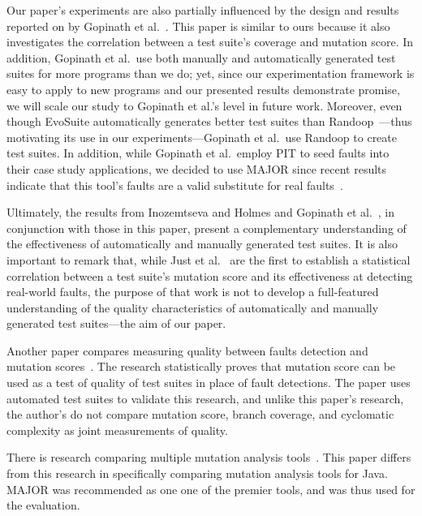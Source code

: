 Our paper's experiments are also partially influenced by the design and results reported on by Gopinath et
al.~\cite{gopinath2014}.  This paper is similar to ours because it also investigates the correlation between a test
suite's coverage and mutation score.  In addition, Gopinath et al.\ use both manually and automatically generated test
suites for more programs than we do; yet, since our experimentation framework is easy to apply to new programs and our
presented results demonstrate promise, we will scale our study to Gopinath et al.'s level in future work. Moreover, even
though EvoSuite automatically generates better test suites than Randoop~\cite{fraser2013a}---thus motivating its use in
our experiments---Gopinath et al.\ use Randoop to create test suites.  In addition, while Gopinath et al.\ employ PIT to
seed faults into their case study applications, we decided to use MAJOR since recent results indicate that this tool's
faults are a valid substitute for real faults~\cite{just2014}. 

Ultimately, the results from Inozemtseva and Holmes \cite{inozemtseva2014} and Gopinath et al.~\cite{gopinath2014}, in
conjunction with those in this paper, present a complementary understanding of the effectiveness of automatically and
manually generated test suites. It is also important to remark that, while Just et al.~\cite{just2014} are the first to
establish a statistical correlation between a test suite's mutation score and its effectiveness at detecting real-world
faults, the purpose of that work is not to develop a full-featured understanding of the quality characteristics of
automatically and manually generated test suites---the aim of our paper.


Another paper compares measuring quality between faults detection and mutation scores~\cite{just2014}. The research statistically proves that mutation score can be used as a test of quality of test suites in place of fault detections.  The paper uses automated test suites to validate this research, and unlike this paper's research, the author's do not compare mutation score, branch coverage, and cyclomatic complexity as joint measurements of quality. 

There is research comparing multiple mutation analysis tools~\cite{ComparingAutomatedMutationTools:2013}. This paper differs from this research in specifically comparing mutation analysis tools for Java. MAJOR was recommended as one one of the premier tools, and was thus used for the evaluation.
